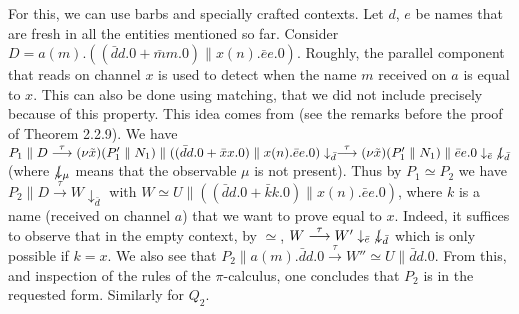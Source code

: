 \documentclass[orivec]{llncs}
\newcommand{\tr}[1]{\stackrel{#1}{\longrightarrow}}
\newcommand{\sbe}{\simeq}
\newcommand{\proend}{\medskip}
\renewenvironment{proof}{\begin{pro}}{\proend\end{pro}}
\begin{document}
\begin{proof}
 For this, we can use barbs and specially crafted contexts.  Let $d$, $e$ be names that are fresh in all the entities mentioned so far. Consider $D = a(m) . ( (\bar d d . 0 + \bar m m . 0) \parallel x(n). \bar e e .0 )$. Roughly, the parallel component that reads on channel $x$ is used to detect when the name $m$ received on $a$ is equal to $x$. This can also be done using matching, that we did not include precisely because of this property. This idea comes from \cite{San01} (see the remarks before the proof of Theorem 2.2.9).
We have $P_1 \parallel D \tr \tau (\nu \tilde x)(P'_1 \parallel N_1) \parallel ((\bar d d . 0 + \bar x x . 0) \parallel x(n) . \bar e e .0 ) \downarrow_{\bar d} \tr \tau (\nu \tilde x)(P'_1 \parallel N_1) \parallel \bar e e .0 \downarrow_{\bar e} \ndownarrow_{\bar d}$ (where $/\hskip -7pt \downarrow_\mu$ means that the observable $\mu$ is not present). Thus by $P_1 \sbe P_2$ we have $P_2 \parallel D \tr \tau W \downarrow_{\bar d}$ with $W \sbe U \parallel  ((\bar d d . 0 + \bar k k . 0) \parallel x(n) . \bar e e .0 )$, where $k$ is a name (received on channel $a$) that we want to prove equal to $x$. Indeed, it suffices to observe that in the empty context, by $\sbe$, $W \tr \tau W'\downarrow _ {\bar e} \ndownarrow_{\bar d}$ which is only possible if $k = x$. We also see that $P_2 \parallel a(m).\bar d d . 0 \tr \tau W'' \sbe U \parallel \bar d d .0$. From this, and inspection of the rules of the $\pi$-calculus, one concludes that $P_2$ is in the requested form. Similarly for $Q_2$.
\end{proof}
\end{document}
